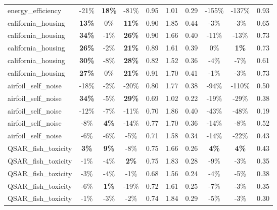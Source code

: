 \begin{table}[!htbp]
\begin{small}
\begin{sc}
{\begin{tabular}{lccccccccc}
energy\_efficiency & -21\% & \textbf{18\%} & -81\% & 0.95 & 1.01 & 0.29 & -155\% & -137\% & 0.93 \\
california\_housing & \textbf{13\%} & 0\% & \textbf{11\%} & 0.90 & 1.85 & 0.44 & -3\% & -3\% & 0.65 \\
california\_housing & \textbf{34\%} & -1\% & \textbf{26\%} & 0.90 & 1.66 & 0.40 & -11\% & -13\% & 0.73 \\
california\_housing & \textbf{26\%} & -2\% & \textbf{21\%} & 0.89 & 1.61 & 0.39 & 0\% & \textbf{1\%} & 0.73 \\
california\_housing & \textbf{30\%} & -8\% & \textbf{28\%} & 0.82 & 1.52 & 0.36 & -4\% & -7\% & 0.61 \\
california\_housing & \textbf{27\%} & 0\% & \textbf{21\%} & 0.91 & 1.70 & 0.41 & -1\% & -3\% & 0.73 \\
airfoil\_self\_noise & -18\% & -2\% & -20\% & 0.80 & 1.77 & 0.38 & -94\% & -110\% & 0.50 \\
airfoil\_self\_noise & \textbf{34\%} & -5\% & \textbf{29\%} & 0.69 & 1.02 & 0.22 & -19\% & -29\% & 0.38 \\
airfoil\_self\_noise & -12\% & -7\% & -11\% & 0.70 & 1.86 & 0.40 & -43\% & -48\% & 0.19 \\
airfoil\_self\_noise & -8\% & \textbf{4\%} & -14\% & 0.77 & 1.70 & 0.36 & -14\% & -8\% & 0.52 \\
airfoil\_self\_noise & -6\% & -6\% & -5\% & 0.71 & 1.58 & 0.34 & -14\% & -22\% & 0.43 \\
QSAR\_fish\_toxicity & \textbf{3\%} & \textbf{9\%} & -8\% & 0.75 & 1.66 & 0.26 & \textbf{4\%} & \textbf{4\%} & 0.43 \\
QSAR\_fish\_toxicity & -1\% & -4\% & \textbf{2\%} & 0.75 & 1.83 & 0.28 & -9\% & -3\% & 0.35 \\
QSAR\_fish\_toxicity & -3\% & -4\% & -1\% & 0.68 & 1.56 & 0.24 & -4\% & -5\% & 0.38 \\
QSAR\_fish\_toxicity & -6\% & \textbf{1\%} & -19\% & 0.72 & 1.61 & 0.25 & -7\% & -3\% & 0.35 \\
QSAR\_fish\_toxicity & -1\% & -3\% & -2\% & 0.74 & 1.84 & 0.29 & -5\% & -3\% & 0.30 \\
\bottomrule
\end{tabular}
}
\end{sc}
\end{small}
\end{table}
